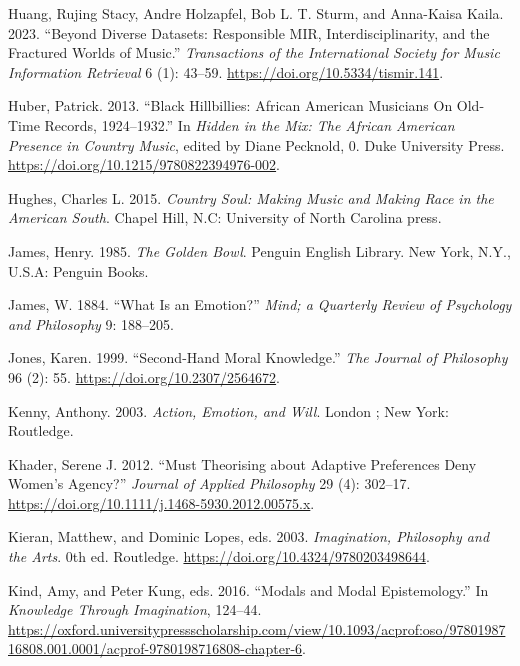 \documentclass[12pt]{book}
\newenvironment{CSLReferences}%
  {\setlength{\parindent}{0pt}%
   \setlength{\leftskip}{0pt}%
   \setlength{\parskip}{0pt}}%
  {\par}
\theoremstyle{definition}
\theoremstyle{remark}
\begin{document}
\begin{CSLReferences}{1}{0}
Huang, Rujing Stacy, Andre Holzapfel, Bob L. T. Sturm, and Anna-Kaisa Kaila. 2023. {``Beyond {Diverse Datasets}: {Responsible MIR}, {Interdisciplinarity}, and the {Fractured Worlds} of {Music}.''} \emph{Transactions of the International Society for Music Information Retrieval} 6 (1): 43--59. \url{https://doi.org/10.5334/tismir.141}.

Huber, Patrick. 2013. {``Black {Hillbillies}: {African American Musicians On Old-Time Records}, 1924--1932.''} In \emph{Hidden in the {Mix}: {The African American Presence} in {Country Music}}, edited by Diane Pecknold, 0. Duke University Press. \url{https://doi.org/10.1215/9780822394976-002}.

Hughes, Charles L. 2015. \emph{Country Soul: Making Music and Making Race in the {American South}}. Chapel Hill, N.C: University of North Carolina press.

James, Henry. 1985. \emph{The Golden Bowl}. Penguin {English} Library. New York, N.Y., U.S.A: Penguin Books.

James, W. 1884. {``What Is an Emotion?''} \emph{Mind; a Quarterly Review of Psychology and Philosophy} 9: 188--205.

Jones, Karen. 1999. {``Second-{Hand Moral Knowledge}.''} \emph{The Journal of Philosophy} 96 (2): 55. \url{https://doi.org/10.2307/2564672}.

Kenny, Anthony. 2003. \emph{Action, Emotion, and Will}. London ; New York: Routledge.

Khader, Serene J. 2012. {``Must {Theorising} about {Adaptive Preferences Deny Women}'s {Agency}?''} \emph{Journal of Applied Philosophy} 29 (4): 302--17. \url{https://doi.org/10.1111/j.1468-5930.2012.00575.x}.

Kieran, Matthew, and Dominic Lopes, eds. 2003. \emph{Imagination, {Philosophy} and the {Arts}}. 0th ed. Routledge. \url{https://doi.org/10.4324/9780203498644}.

Kind, Amy, and Peter Kung, eds. 2016. {``Modals and {Modal Epistemology}.''} In \emph{Knowledge {Through Imagination}}, 124--44. \url{https://oxford.universitypressscholarship.com/view/10.1093/acprof:oso/9780198716808.001.0001/acprof-9780198716808-chapter-6}.


\end{CSLReferences}
\end{document}
